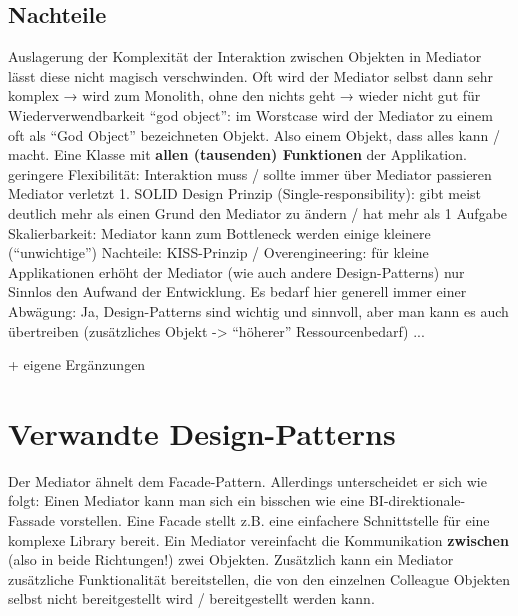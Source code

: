 \filbreak
\subsection{Nachteile}
\begin{outline}
    \1 Auslagerung der Komplexität der Interaktion zwischen Objekten in Mediator lässt diese nicht magisch verschwinden. Oft wird der Mediator selbst dann sehr komplex → wird zum Monolith, ohne den nichts geht → wieder nicht gut für Wiederverwendbarkeit
    \1 \enquote{god object}: im Worstcase wird der Mediator zu einem oft als \enquote{God Object} bezeichneten Objekt. Also einem Objekt, dass alles kann / macht. Eine Klasse mit \textbf{allen (tausenden) Funktionen} der Applikation.
    \1 geringere Flexibilität: Interaktion muss / sollte immer über Mediator passieren
    \1 Mediator verletzt 1. SOLID Design Prinzip (Single-responsibility): gibt meist deutlich mehr als einen Grund den Mediator zu ändern / hat mehr als 1 Aufgabe
    \1 Skalierbarkeit: Mediator kann zum Bottleneck werden
    \1 einige kleinere (\enquote{unwichtige}) Nachteile:
        \2 KISS-Prinzip / Overengineering: für kleine Applikationen erhöht der Mediator (wie auch andere Design-Patterns) nur Sinnlos den Aufwand der Entwicklung. Es bedarf hier generell immer einer Abwägung: Ja, Design-Patterns sind wichtig und sinnvoll, aber man kann es auch übertreiben
        \2 (zusätzliches Objekt -> \enquote{höherer} Ressourcenbedarf)
    \1 ...
\end{outline}

\autocite[vgl.][S. 273ff]{gangoffour_book} + eigene Ergänzungen
% 
\section{Verwandte Design-Patterns}
Der Mediator ähnelt dem Facade-Pattern. Allerdings unterscheidet er sich wie folgt: Einen Mediator kann man sich ein bisschen wie eine BI-direktionale-Fassade vorstellen. Eine Facade stellt z.B. eine einfachere Schnittstelle für eine komplexe Library bereit. Ein Mediator vereinfacht die Kommunikation \textbf{zwischen} (also in beide Richtungen!) zwei Objekten. Zusätzlich kann ein Mediator zusätzliche Funktionalität bereitstellen, die von den einzelnen Colleague Objekten selbst nicht bereitgestellt wird / bereitgestellt werden kann. 
\autocite[vgl.][S. 273ff]{gangoffour_book}